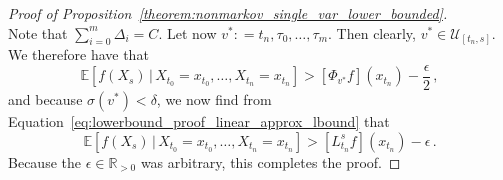 \documentclass[10pt]{paper}
\theoremstyle{definition}
\newcommand{\reals}{\mathbb{R}}
\newcommand{\realspos}{\reals_{>0}}
\newcommand{\coloneqq}{:\!=}
\begin{document}
\begin{proof}[Proof of Proposition~\ref{theorem:nonmarkov_single_var_lower_bounded}]
\begin{equation*}
\end{equation*}
Note that $\sum_{i=0}^m\Delta_i=C$. Let now $v^*\coloneqq t_n,\tau_0,\ldots,\tau_m$. Then clearly, $v^*\in\mathcal{U}_{[t_n,s]}$. We therefore have that
\begin{equation*}
\mathbb{E}[f(X_s)\,\vert\,X_{t_0}=x_{t_0},\ldots,X_{t_n}=x_{t_n}] > \left[\Phi_{v^*}f\right](x_{t_n}) - \frac{\epsilon}{2}\,,
\end{equation*}
and because $\sigma(v^*)<\delta$, we now find from Equation~\eqref{eq:lowerbound_proof_linear_approx_lbound} that
\begin{equation*}
\mathbb{E}[f(X_s)\,\vert\,X_{t_0}=x_{t_0},\ldots,X_{t_n}=x_{t_n}] > \left[L_{t_n}^sf\right](x_{t_n}) - \epsilon\,.
\end{equation*}
Because the $\epsilon\in\realspos$ was arbitrary, this completes the proof.
\end{proof}
\end{document}
